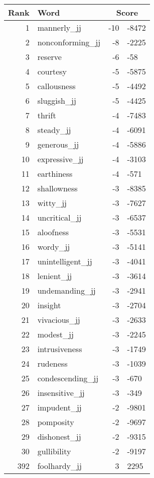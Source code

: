 \begin{longtable}[!htbp]{| rlr@{.}l |}
    \hline
    \textbf{Rank} & \textbf{Word} & \multicolumn{2}{c|}{\textbf{Score}} \\
    \hline
    \endhead
    1 & mannerly\_jj & -10 & -8472 \\
    2 & nonconforming\_jj & -8 & -2225 \\
    3 & reserve & -6 & -58 \\
    4 & courtesy & -5 & -5875 \\
    5 & callousness & -5 & -4492 \\
    6 & sluggish\_jj & -5 & -4425 \\
    7 & thrift & -4 & -7483 \\
    8 & steady\_jj & -4 & -6091 \\
    9 & generous\_jj & -4 & -5886 \\
    10 & expressive\_jj & -4 & -3103 \\
    11 & earthiness & -4 & -571 \\
    12 & shallowness & -3 & -8385 \\
    13 & witty\_jj & -3 & -7627 \\
    14 & uncritical\_jj & -3 & -6537 \\
    15 & aloofness & -3 & -5531 \\
    16 & wordy\_jj & -3 & -5141 \\
    17 & unintelligent\_jj & -3 & -4041 \\
    18 & lenient\_jj & -3 & -3614 \\
    19 & undemanding\_jj & -3 & -2941 \\
    20 & insight & -3 & -2704 \\
    21 & vivacious\_jj & -3 & -2633 \\
    22 & modest\_jj & -3 & -2245 \\
    23 & intrusiveness & -3 & -1749 \\
    24 & rudeness & -3 & -1039 \\
    25 & condescending\_jj & -3 & -670 \\
    26 & insensitive\_jj & -3 & -349 \\
    27 & impudent\_jj & -2 & -9801 \\
    28 & pomposity & -2 & -9697 \\
    29 & dishonest\_jj & -2 & -9315 \\
    30 & gullibility & -2 & -9197 \\
    392 & foolhardy\_jj & 3 & 2295 \\

\end{longtable}
